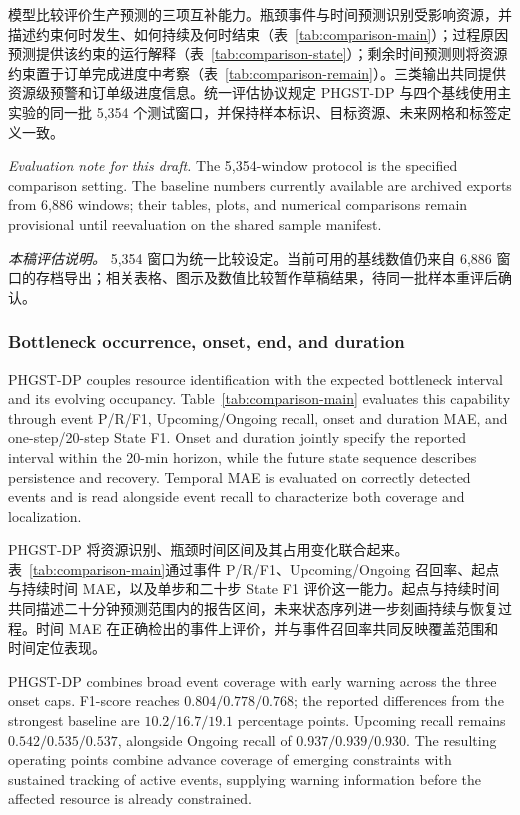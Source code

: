 \documentclass[a4paper,fleqn]{cas-dc}
\newcommand{\zhpara}[1]{%
  \par\begingroup\small\color{black!72}\noindent #1\par\endgroup}
\begin{document}
\zhpara{模型比较评价生产预测的三项互补能力。瓶颈事件与时间预测识别受影响资源，并描述约束何时发生、如何持续及何时结束（表~\ref{tab:comparison-main}）；过程原因预测提供该约束的运行解释（表~\ref{tab:comparison-state}）；剩余时间预测则将资源约束置于订单完成进度中考察（表~\ref{tab:comparison-remain}）。三类输出共同提供资源级预警和订单级进度信息。统一评估协议规定 PHGST-DP 与四个基线使用主实验的同一批 5,354 个测试窗口，并保持样本标识、目标资源、未来网格和标签定义一致。}

\textit{Evaluation note for this draft.} The 5,354-window protocol is the specified comparison setting. The baseline numbers currently available are archived exports from 6,886 windows; their tables, plots, and numerical comparisons remain provisional until reevaluation on the shared sample manifest.

\zhpara{\textit{本稿评估说明。} 5,354 窗口为统一比较设定。当前可用的基线数值仍来自 6,886 窗口的存档导出；相关表格、图示及数值比较暂作草稿结果，待同一批样本重评后确认。}

\subsubsection{Bottleneck occurrence, onset, end, and duration}\label{sec:comparison-event}

PHGST-DP couples resource identification with the expected bottleneck interval and its evolving occupancy. Table~\ref{tab:comparison-main} evaluates this capability through event P/R/F1, Upcoming/Ongoing recall, onset and duration MAE, and one-step/20-step State F1. Onset and duration jointly specify the reported interval within the 20-min horizon, while the future state sequence describes persistence and recovery. Temporal MAE is evaluated on correctly detected events and is read alongside event recall to characterize both coverage and localization.

\zhpara{PHGST-DP 将资源识别、瓶颈时间区间及其占用变化联合起来。表~\ref{tab:comparison-main}通过事件 P/R/F1、Upcoming/Ongoing 召回率、起点与持续时间 MAE，以及单步和二十步 State F1 评价这一能力。起点与持续时间共同描述二十分钟预测范围内的报告区间，未来状态序列进一步刻画持续与恢复过程。时间 MAE 在正确检出的事件上评价，并与事件召回率共同反映覆盖范围和时间定位表现。}

PHGST-DP combines broad event coverage with early warning across the three onset caps. F1-score reaches $0.804/0.778/0.768$; the reported differences from the strongest baseline are $10.2/16.7/19.1$ percentage points. Upcoming recall remains $0.542/0.535/0.537$, alongside Ongoing recall of $0.937/0.939/0.930$. The resulting operating points combine advance coverage of emerging constraints with sustained tracking of active events, supplying warning information before the affected resource is already constrained.
\end{document}
